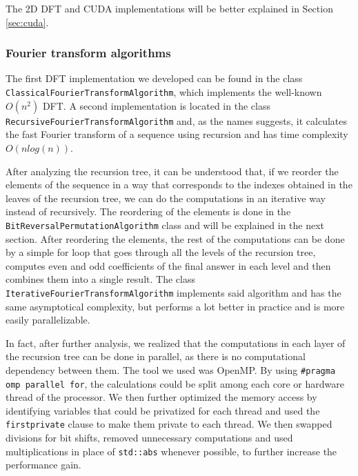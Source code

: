 The 2D DFT and CUDA implementations will be better explained in Section \ref{sec:cuda}.

\subsubsection{Fourier transform algorithms}
The first DFT implementation we developed can be found in the class \texttt{Classical\-Fourier\-Transform\-Algorithm}, which implements the well-known $O(n^2)$ DFT.  A second implementation is located in the class \texttt{Recursive\-Fourier\-Transform\-Algorithm} and, as the names suggests, it calculates the fast Fourier transform of a sequence using recursion and has time complexity $O(n log(n))$. 

After analyzing the recursion tree, it can be understood that, if we reorder the elements of the sequence in a way that corresponds to the indexes obtained in the leaves of the recursion tree, we can do the computations in an iterative way instead of recursively. The reordering of the elements is done in the \texttt{Bit\-Reversal\-Permutation\-Algorithm} class and will be explained in the next section. After reordering the elements, the rest of the computations can be done by a simple for loop that goes through all the levels of the recursion tree, computes even and odd coefficients of the final answer in each level and then combines them into a single result. The class \texttt{Iterative\-Fourier\-Transform\-Algorithm} implements said algorithm and has the same asymptotical complexity, but performs a lot better in practice and is more easily parallelizable.

In fact, after further analysis, we realized that the computations in each layer of the recursion tree can be done in parallel, as there is no computational dependency between them. The tool we used was OpenMP. By using \texttt{\#pragma omp parallel for}, the calculations could be split among each core or hardware thread of the processor. We then further optimized the memory access by identifying variables that could be privatized for each thread and used the \texttt{firstprivate} clause to make them private to each thread. We then swapped divisions for bit shifts, removed unnecessary computations and used multiplications in place of \texttt{std::abs} whenever possible, to further increase the performance gain.

